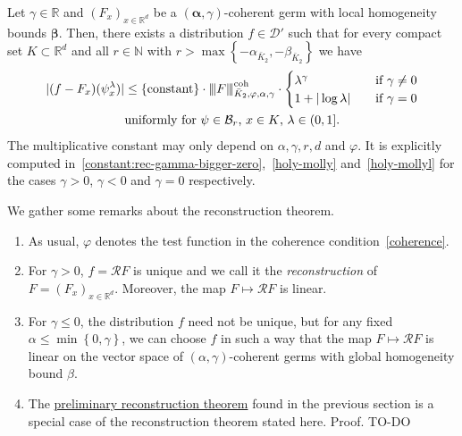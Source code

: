\begin{theorem}\label{theorem:reconstruction-theorem}
   Let \(\gamma \in \mathbb{R}\) and \({(F_x)}_{x \in \mathbb{R}^d}\) be a \((\bm{\alpha}, \gamma)\)-coherent germ with local homogeneity bounds \(\bm \beta\). Then, there exists a distribution \(f \in \mathcal{D}'\) such that for every compact set \(K \subset \mathbb{R}^d\) and all \(r \in \mathbb{N}\) with \(r> \max \left\{ -\alpha_{\bar K_2}, -\beta_{\bar K_2} \right\}\) we have
   \begin{gather}\label{reconstruction-theorem}
        |(f-F_x)(\psi^\lambda_x)| \leq \{\mathrm{constant} \} \cdot {\left\vert\kern-0.25ex\left\vert\kern-0.25ex\left\vert F \right\vert\kern-0.25ex\right\vert\kern-0.25ex\right\vert}^{\mathrm{coh}}_{\bar K_2, \varphi, \alpha, \gamma} \cdot \begin{cases}
            \lambda^\gamma \quad & \text{if \(\gamma \neq 0\)}\\
            1 + |\log \lambda| \quad & \text{if \(\gamma = 0\)}
        \end{cases}
        \\ \text{uniformly for \(\psi \in \mathcal{B}_r\), \(x \in K\), \(\lambda \in (0,1]\).} \nonumber
   \end{gather}
   The multiplicative constant may only depend on \( \alpha, \gamma, r, d \) and \( \varphi \). It is explicitly computed in~\eqref{constant:rec-gamma-bigger-zero},~\eqref{holy-molly} and~\eqref{holy-mollyl} for the cases \( \gamma > 0 \), \( \gamma < 0 \) and \( \gamma = 0 \) respectively.
\end{theorem}

\begin{remark} 
   We gather some remarks about the reconstruction theorem.
\begin{enumerate}
   \item As usual, \(\varphi\) denotes the test function in the coherence condition~\eqref{coherence}.
   \item For \(\gamma > 0\), \(f = \mathcal{R}F\) is unique and we call it the \emph{reconstruction} of \(F = {(F_x)}_{x \in \mathbb{R}^d}\). Moreover, the map \(F \mapsto \mathcal{R}F\) is linear.
   \item For \(\gamma \leq 0\), the distribution \(f\) need not be unique, but for any fixed \(\alpha \leq \min\left\{ 0, \gamma \right\}\), we can choose \(f\) in such a way that the map \(F \mapsto \mathcal{R}F\) is linear on the vector space of \((\alpha,\gamma)\)-coherent germs with global homogeneity bound \(\beta\).
   \item The \hyperref[peek:prelim-reconstruction-theorem]{preliminary reconstruction theorem} found in the previous section is a special case of the reconstruction theorem stated here. Proof. TO-DO
\end{enumerate}
\end{remark}

